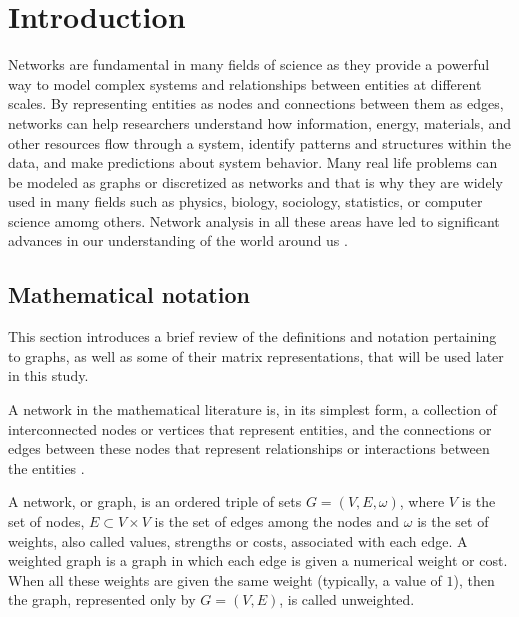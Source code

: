 
\chapter[Introduction]{Introduction}
\label{chap:intro}

Networks are fundamental in many fields of science as they provide a powerful way to model complex systems and relationships between entities at different scales. By representing entities as nodes and connections between them as edges, networks can help researchers understand how information, energy, materials, and other resources flow through a system, identify patterns and structures within the data, and make predictions about system behavior. Many real life problems can be modeled as graphs or discretized as networks and that is why they are widely used in many fields such as physics, biology, sociology, statistics, or computer science amomg others. Network analysis in all these areas have led to significant advances in our understanding of the world around us \cite{albert2002statistical, katz1953new, newman2018networks}.

\section{Mathematical notation}
\label{sec:graph}
This section introduces a brief review of the definitions and notation pertaining to graphs, as well as some of their matrix representations, that will be used later in this study.

A network in the mathematical literature is, in its simplest form, a collection of interconnected nodes or vertices that represent entities, and the connections or edges between these nodes that represent relationships or interactions between the entities \cite{arrigo2022dynamic}.

\begin{definition}
    A network, or graph, is an ordered triple of sets $G = (V, E, \omega)$, where $V$ is the set of nodes, $E\subset V\times V$ is the set of edges among the nodes and $\omega$ is the set of  weights, also called values, strengths or costs, associated with each edge. A weighted graph is a graph in which each edge is given a numerical weight or cost. When all these weights are given the same weight (typically, a value of $1$), then the graph, represented only by $G = (V, E)$, is called unweighted.
\end{definition}

